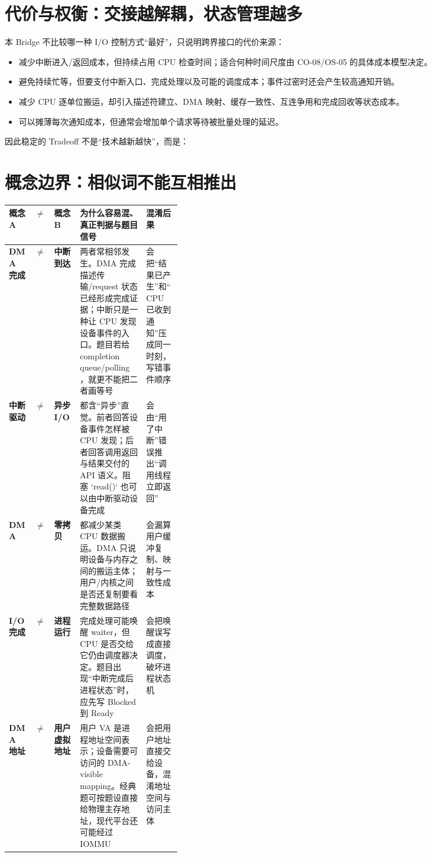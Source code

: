 \documentclass[UTF8,fontset=none,11pt,a4paper]{ctexart}
\begin{document}
\section{代价与权衡：交接越解耦，状态管理越多}

本 Bridge 不比较哪一种 I/O 控制方式“最好”，只说明跨界接口的代价来源：

\begin{itemize}
  \item {}减少中断进入/返回成本，但持续占用 CPU 检查时间；适合何种时间尺度由 CO-08/OS-05 的具体成本模型决定。
  \item {}避免持续忙等，但要支付中断入口、完成处理以及可能的调度成本；事件过密时还会产生较高通知开销。
  \item {}减少 CPU 逐单位搬运，却引入描述符建立、DMA 映射、缓存一致性、互连争用和完成回收等状态成本。
  \item {}可以摊薄每次通知成本，但通常会增加单个请求等待被批量处理的延迟。
\end{itemize}

因此稳定的 Tradeoff 不是“技术越新越快”，而是：

\section{概念边界：相似词不能互相推出}

\begin{center}
\scriptsize
\renewcommand{\arraystretch}{1.28}
\begin{tabularx}{\linewidth}{>{\bfseries}p{0.15\linewidth} >{\centering\arraybackslash}p{0.035\linewidth} >{\bfseries}p{0.15\linewidth} X X}
\toprule
概念 A & $\neq$ & 概念 B & 为什么容易混、真正判据与题目信号 & 混淆后果 \\
\midrule
DMA 完成 & $\neq$ & 中断到达 & 两者常相邻发生。DMA 完成描述传输/request 状态已经形成完成证据；中断只是一种让 CPU 发现设备事件的入口。题目若给 completion queue/polling，就更不能把二者画等号 & 会把“结果已产生”和“CPU 已收到通知”压成同一时刻，写错事件顺序 \\
中断驱动 & $\neq$ & 异步 I/O & 都含“异步”直觉。前者回答设备事件怎样被 CPU 发现；后者回答调用返回与结果交付的 API 语义。阻塞 `read()` 也可以由中断驱动设备完成 & 会由“用了中断”错误推出“调用线程立即返回” \\
DMA & $\neq$ & 零拷贝 & 都减少某类 CPU 数据搬运。DMA 只说明设备与内存之间的搬运主体；用户/内核之间是否还复制要看完整数据路径 & 会漏算用户缓冲复制、映射与一致性成本 \\
I/O 完成 & $\neq$ & 进程运行 & 完成处理可能唤醒 waiter，但 CPU 是否交给它仍由调度器决定。题目出现“中断完成后进程状态”时，应先写 Blocked 到 Ready & 会把唤醒误写成直接调度，破坏进程状态机 \\
DMA 地址 & $\neq$ & 用户虚拟地址 & 用户 VA 是进程地址空间表示；设备需要可访问的 DMA-visible mapping。经典题可按题设直接给物理主存地址，现代平台还可能经过 IOMMU & 会把用户地址直接交给设备，混淆地址空间与访问主体 \\
\bottomrule
\end{tabularx}
\end{center}
\end{document}
